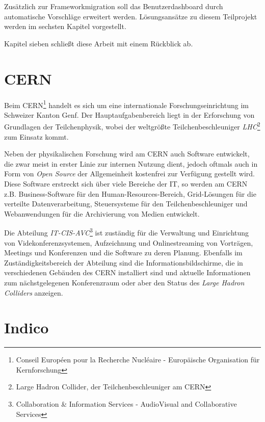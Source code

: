 Zusätzlich zur Frameworkmigration soll das Benutzerdashboard durch automatische Vorschläge erweitert
werden. Lösungsansätze zu diesem Teilprojekt werden im sechsten Kapitel vorgestellt.

Kapitel sieben schließt diese Arbeit mit einem Rückblick ab.


\section{CERN}

Beim CERN\footnote{Conseil Européen pour la Recherche Nucléaire - Europäische Organisation für
Kernforschung} handelt es sich um eine internationale Forschungseinrichtung im Schweizer Kanton
Genf. Der Hauptaufgabenbereich liegt in der Erforschung von Grundlagen der Teilchenphysik, wobei der
weltgrößte Teilchenbeschleuniger \emph{LHC}\footnote{Large Hadron Collider, der
Teilchenbeschleuniger am CERN} zum Einsatz kommt.

Neben der physikalischen Forschung wird am CERN auch Software entwickelt, die zwar meist in erster
Linie zur internen Nutzung dient, jedoch oftmals auch in Form von \emph{Open Source} der
Allgemeinheit kostenfrei zur Verfügung gestellt wird. Diese Software erstreckt sich über viele
Bereiche der IT, so werden am CERN z.B. Business-Software für den Human-Resources-Bereich,
Grid-Lösungen für die verteilte Datenverarbeitung, Steuersysteme für den Teilchenbeschleuniger und
Webanwendungen für die Archivierung von Medien entwickelt.

Die Abteilung \emph{IT-CIS-AVC}\footnote{Collaboration \& Information Services - AudioVisual and
Collaborative Services} ist zuständig für die Verwaltung und Einrichtung von Videkonferenzsystemen,
Aufzeichnung und Onlinestreaming von Vorträgen, Meetings und Konferenzen und die Software zu deren
Planung. Ebenfalls im Zuständigkeitsbereich der Abteilung sind die Informationsbildschirme, die in
verschiedenen Gebäuden des CERN installiert sind und aktuelle Informationen zum nächstgelegenen
Konferenzraum oder aber den Status des \emph{Large Hadron Colliders} anzeigen.


\section{Indico}


